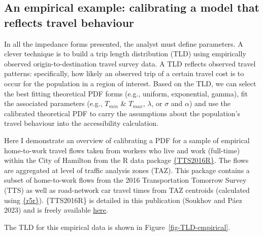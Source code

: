 \documentclass[12pt, oneside]{report}
\begin{document}
\hypertarget{an-empirical-example-calibrating-a-model-that-reflects-travel-behaviour}{%
\subsection{An empirical example: calibrating a model that reflects
travel
behaviour}\label{an-empirical-example-calibrating-a-model-that-reflects-travel-behaviour}}

In all the impedance forms presented, the analyst must define
parameters. A clever technique is to build a trip length distribution
(TLD) using empirically observed origin-to-destination travel survey
data. A TLD reflects observed travel patterns: specifically, how likely
an observed trip of a certain travel cost is to occur for the population
in a region of interest. Based on the TLD, we can select the best
fitting theoretical PDF forms (e.g., uniform, exponential, gamma), fit
the associated parameters (e.g., \(T_{min}\) \& \(T_{max}\),
\(\lambda\), or \(\sigma\) and \(\alpha\)) and use the calibrated
theoretical PDF to carry the assumptions about the population's travel
behaviour into the accessibility calculation.

Here I demonstrate an overview of calibrating a PDF for a sample of
empirical home-to-work travel flows taken from workers who live and work
(full-time) within the City of Hamilton from the R data package
\href{https://soukhova.github.io/TTS2016R/}{\{TTS2016R\}}. The flows are
aggregated at level of traffic analysis zones (TAZ). This package
contains a subset of home-to-work flows from the 2016 Transportation
Tomorrow Survey (TTS) as well as road-network car travel times from TAZ
centroids (calculated using
\href{https://doi.org/10.32866/001c.21262}{\{r5r\}}). \{TTS2016R\} is
detailed in this publication (Soukhov and Páez 2023) and is freely
available \href{https://soukhova.github.io/TTS2016R/}{here}.

The TLD for this empirical data is shown in
Figure~\ref{fig-TLD-empirical}.
\end{document}
